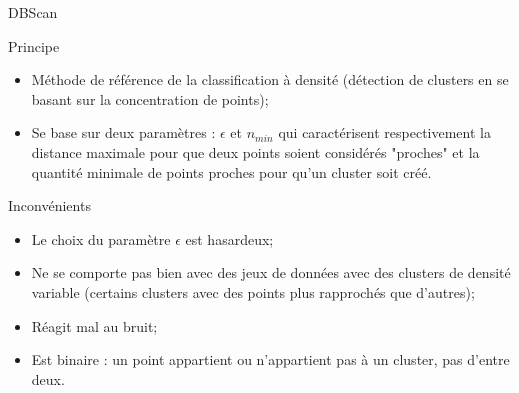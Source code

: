 \begin{frame}{DBScan}
    \begin{block}{Principe}
        \begin{itemize}
            \item Méthode de référence de la classification à densité (détection de clusters en se basant sur la concentration de points);
            \item Se base sur deux paramètres : $\epsilon$ et $n_{min}$ qui caractérisent respectivement la distance maximale pour que deux points soient considérés "proches" et la quantité minimale de points proches pour qu'un cluster soit créé.
        \end{itemize}
    \end{block}

    \begin{block}{Inconvénients}
        \begin{itemize}
            \item Le choix du paramètre $\epsilon$ est hasardeux;
            \item Ne se comporte pas bien avec des jeux de données avec des clusters de densité variable (certains clusters avec des points plus rapprochés que d'autres);
            \item Réagit mal au bruit;
            \item Est binaire : un point appartient ou n'appartient pas à un cluster, pas d'entre deux.
        \end{itemize}
    \end{block}
\end{frame}

